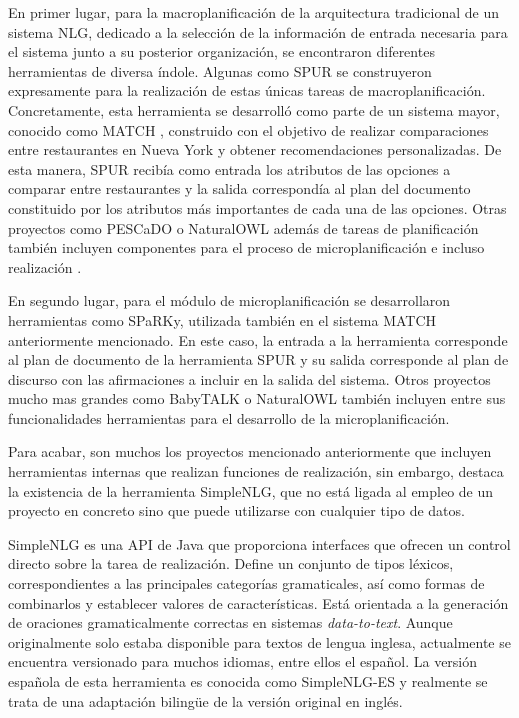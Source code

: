 En primer lugar, para la macroplanificación de la arquitectura tradicional de un sistema NLG, dedicado a  la selección de la información de entrada necesaria para el sistema junto a su posterior organización, se encontraron diferentes herramientas de diversa índole. Algunas como SPUR se construyeron expresamente para la realización de estas únicas tareas de macroplanificación. Concretamente, esta herramienta se desarrolló como parte de un sistema mayor, conocido como MATCH \citep{johnston-etal-2002-match}, construido con el objetivo de realizar comparaciones entre restaurantes en Nueva York y obtener recomendaciones personalizadas. De esta manera, SPUR recibía como entrada los atributos de las opciones a comparar entre restaurantes y la salida correspondía al plan del documento constituido por los atributos más importantes de cada una de las opciones. Otras proyectos como PESCaDO \citep{pescado} o NaturalOWL \citep{Androutsopoulos_2014} además de tareas de planificación también incluyen componentes para el proceso de microplanificación e incluso realización .


En segundo lugar, para el módulo de microplanificación se desarrollaron herramientas como SPaRKy, utilizada también en el sistema MATCH anteriormente mencionado. En este caso, la entrada a la herramienta corresponde al plan de documento de la herramienta SPUR y su salida corresponde al plan de discurso con las afirmaciones a incluir en la salida del sistema. Otros proyectos mucho mas grandes como BabyTALK \citep{gatt_2009_babytalk} o NaturalOWL también incluyen entre sus funcionalidades herramientas para el desarrollo de la microplanificación.

Para acabar, son muchos los proyectos mencionado anteriormente que incluyen herramientas internas que realizan funciones de realización, sin embargo, destaca la existencia de la herramienta SimpleNLG, que no está ligada al empleo de un proyecto en concreto sino que puede utilizarse con cualquier tipo de datos.

SimpleNLG \citep{simplenlg_gatt} es una API de Java que proporciona interfaces que ofrecen un control directo sobre la tarea de realización. Define un conjunto de tipos léxicos, correspondientes a las principales categorías gramaticales, así como formas de combinarlos y establecer valores de características. Está orientada a la generación de oraciones gramaticalmente correctas en sistemas \textit{data-to-text}. Aunque originalmente solo estaba disponible para textos de lengua inglesa, actualmente se encuentra versionado para muchos idiomas, entre ellos el español. La versión española de esta herramienta es conocida como SimpleNLG-ES \citep{aramossoto2017adapting} y realmente se trata de una adaptación bilingüe de la versión original en inglés.

